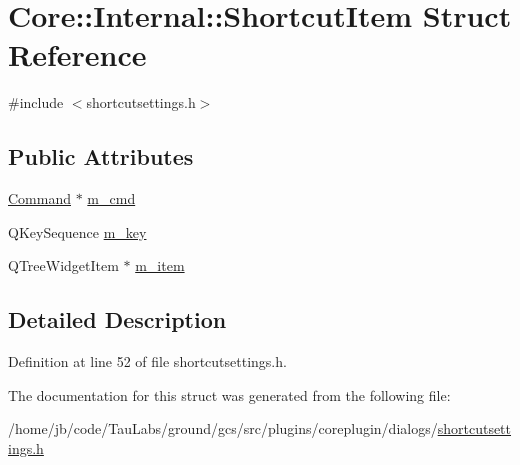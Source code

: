\hypertarget{struct_core_1_1_internal_1_1_shortcut_item}{\section{\-Core\-:\-:\-Internal\-:\-:\-Shortcut\-Item \-Struct \-Reference}
\label{struct_core_1_1_internal_1_1_shortcut_item}
}


{\ttfamily \#include $<$shortcutsettings.\-h$>$}

\subsection*{\-Public \-Attributes}
\begin{DoxyCompactItemize}
\item 
\hyperlink{class_core_1_1_command}{\-Command} $\ast$ \hyperlink{group___core_plugin_ga10e0ddc6c4c316f39a3b00b92083148a}{m\-\_\-cmd}
\item 
\-Q\-Key\-Sequence \hyperlink{group___core_plugin_ga8d081cf37bef5964c2751dc5a1947480}{m\-\_\-key}
\item 
\-Q\-Tree\-Widget\-Item $\ast$ \hyperlink{group___core_plugin_ga318cf2024e20ff1114f406d188f3f3c7}{m\-\_\-item}
\end{DoxyCompactItemize}


\subsection{\-Detailed \-Description}


\-Definition at line 52 of file shortcutsettings.\-h.



\-The documentation for this struct was generated from the following file\-:\begin{DoxyCompactItemize}
\item 
/home/jb/code/\-Tau\-Labs/ground/gcs/src/plugins/coreplugin/dialogs/\hyperlink{shortcutsettings_8h}{shortcutsettings.\-h}\end{DoxyCompactItemize}
